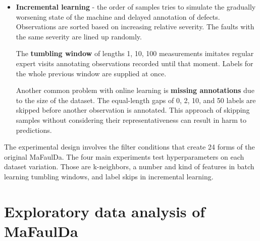 \begin{itemize}
\item \textbf{Incremental learning} - the order of samples tries to simulate the gradually worsening state of the machine and delayed annotation of defects. Observations are sorted based on increasing relative severity. The faults with the same severity are lined up randomly. 

The \textbf{tumbling window} of lengths 1, 10, 100 measurements imitates regular expert visits annotating observations recorded until that moment. Labels for the whole previous window are supplied at once.

Another common problem with online learning is \textbf{missing annotations} due to the size of the dataset. The equal-length gaps of 0, 2, 10, and 50 labels are skipped before another observation is annotated. This approach of skipping samples without considering their representativeness can result in harm to predictions. 
\end{itemize}

The experimental design involves the filter conditions that create 24 forms of the original MaFaulDa. The four main experiments test hyperparameters on each dataset variation. Those are k-neighbors, a number and kind of features in batch learning tumbling windows, and label skips in incremental learning.

\section{Exploratory data analysis of MaFaulDa}


